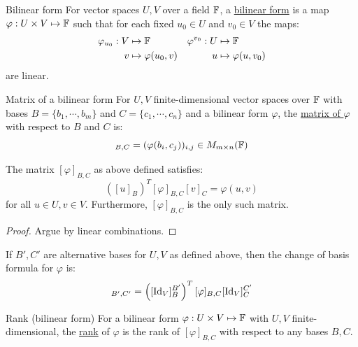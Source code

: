 \documentclass[../Main.tex]{subfiles}
\begin{document}
\begin{definition}{Bilinear form}
    For vector spaces $U, V$ over a field $\mathbb{F}$, a \underline{bilinear form} is a map $\varphi : U \times V \mapsto \mathbb{F}$ such that for each fixed $u_0 \in U$ and $v_0 \in V$ the maps:
    \begin{align*}
        \varphi_{u_0} : V &\mapsto \mathbb{F} & \varphi^{v_0} : U &\mapsto \mathbb{F} \\
        v &\mapsto \varphi(u_0, v) & u &\mapsto \varphi(u, v_0)
    \end{align*}
    are linear.
\end{definition}
\begin{definition}{Matrix of a bilinear form}
    For $U, V$ finite-dimensional vector spaces over $\mathbb{F}$ with bases $B = \{b_1, \cdots, b_m\}$ and $C = \{c_1, \cdots, c_n\}$ and a bilinear form $\varphi$, the \underline{matrix of $\varphi$} with respect to $B$ and $C$ is:
    \begin{equation*}
        [\varphi]_{B, C} = (\varphi(b_i, c_j))_{i, j} \in M_{m \times n}(\F)
    \end{equation*}
\end{definition}
\begin{proposition}
    The matrix $[\varphi]_{B, C}$ as above defined satisfies:
    \begin{equation}
        \left([u]_B\right)^T [\varphi]_{B, C} [v]_C = \varphi(u, v)
        \label{eqnBFMatrix}
    \end{equation}
    for all $u \in U, v \in V$. Furthermore, $[\varphi]_{B, C}$ is the only such matrix.
    \label{propBFMatrix}
\end{proposition}
\begin{proof}
    Argue by linear combinations.
\end{proof}
\begin{corollary}
    If $B', C'$ are alternative bases for $U, V$ as defined above, then the change of basis formula for $\varphi$ is:
    \begin{equation*}
        [\varphi]_{B', C'} = \left([\Id_V]^{B'}_{B}\right)^T [\varphi]_{B, C} [\Id_V]^{C'}_C
    \end{equation*}
    \label{corBFChangeBasis}
\end{corollary}
\begin{definition}{Rank (bilinear form)}
    For a bilinear form $\varphi : U \times V \mapsto \mathbb{F}$ with $U, V$ finite-dimensional, the \underline{rank} of $\varphi$ is the rank of $[\varphi]_{B, C}$ with respect to any bases $B, C$.
\end{definition}
\end{document}
